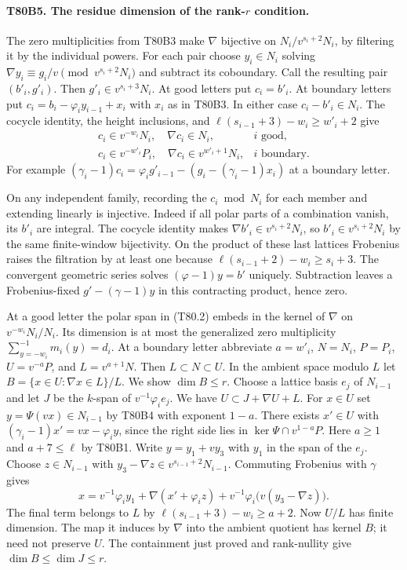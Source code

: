 \paragraph{T80B5. The residue dimension of the rank-$r$ condition.}
The zero multiplicities from T80B3 make $\nabla$ bijective on
$N_i/v^{s_i+2}N_i$, by filtering it by the individual powers. For
each pair choose $y_i\in N_i$ solving
$\nabla y_i\equiv g_i/v\pmod{v^{s_i+2}N_i}$ and subtract its
coboundary. Call the resulting pair $(b'_i,g'_i)$. Then
$g'_i\in v^{s_i+3}N_i$. At good letters put $c_i=b'_i$.
At boundary letters put $c_i=b_i-\varphi_i y_{i-1}+x_i$ with $x_i$
as in T80B3. In either case $c_i-b'_i\in N_i$. The cocycle identity,
the height inclusions, and $\ell(s_{i-1}+3)-w_i\ge w'_i+2$ give
\[
 \begin{array}{ll}
 c_i\in v^{-w_i}N_i,\quad \nabla c_i\in N_i,
                                      &i\text{ good},\\
 c_i\in v^{-w'_i}P_i,\quad \nabla c_i\in v^{w'_i+1}N_i,
                                      &i\text{ boundary}.
 \end{array}                                                    \tag{T80.2}
\]
For example $(\gamma_i-1)c_i=\varphi_i g'_{i-1}-
(g_i-(\gamma_i-1)x_i)$ at a boundary letter.

On any independent family, recording the $c_i\bmod N_i$ for each
member and extending linearly is injective. Indeed if all polar parts
of a combination vanish, its $b'_i$ are integral. The cocycle identity
makes $\nabla b'_i\in v^{s_i+2}N_i$, so $b'_i\in v^{s_i+2}N_i$
by the same finite-window bijectivity. On the product of these last
lattices Frobenius raises the filtration by at least one because
$\ell(s_{i-1}+2)-w_i\ge s_i+3$. The convergent geometric series
solves $(\varphi-1)y=b'$ uniquely. Subtraction leaves a Frobenius-fixed
$g'-(\gamma-1)y$ in this contracting product, hence zero.

At a good letter the polar span in (T80.2) embeds in the kernel of
$\nabla$ on $v^{-w_i}N_i/N_i$. Its dimension is at most the
generalized zero multiplicity $\sum_{y=-w_i}^{-1}m_i(y)=d_i$.
At a boundary letter abbreviate $a=w'_i$, $N=N_i$, $P=P_i$,
$U=v^{-a}P$, and $L=v^{a+1}N$. Then $L\subset N\subset U$.
In the ambient space modulo $L$ let
$B=\{x\in U:\nabla x\in L\}/L$. We show $\dim B\le r$.
Choose a lattice basis $e_j$ of $N_{i-1}$ and let $J$ be the
$k$-span of $v^{-1}\varphi_i e_j$. We have
$U\subset J+\nabla U+L$. For $x\in U$ set
$y=\Psi(vx)\in N_{i-1}$ by T80B4 with exponent $1-a$.
There exists $x'\in U$ with
$(\gamma_i-1)x'=vx-\varphi_i y$, since the right side lies
in $\ker\Psi\cap v^{1-a}P$. Here $a\ge1$ and $a+7\le\ell$ by T80B1.
Write $y=y_1+vy_3$ with $y_1$ in the span of the $e_j$. Choose
$z\in N_{i-1}$ with $y_3-\nabla z\in v^{s_{i-1}+2}N_{i-1}$.
Commuting Frobenius with $\gamma$ gives
\[
 x=v^{-1}\varphi_i y_1+\nabla(x'+\varphi_i z)
    +v^{-1}\varphi_i\big(v(y_3-\nabla z)\big).
\]
The final term belongs to $L$ by $\ell(s_{i-1}+3)-w_i\ge a+2$.
Now $U/L$ has finite dimension. The map it induces by $\nabla$ into
the ambient quotient has kernel $B$; it need not preserve $U$.
The containment just proved and rank-nullity give
$\dim B\le\dim J\le r$.

